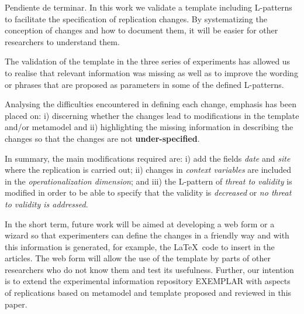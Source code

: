 
\textcolor[rgb]{1,0,0}{Pendiente de terminar.} In this work we validate a template including L-patterns to facilitate the specification of replication changes. By systematizing the conception of changes and how to document them, it will be easier for other researchers to understand them.


The validation of the template in the three series of experiments has allowed us to realise that relevant information was missing as well as to improve the wording or phrases that are proposed as parameters in some of the defined L-patterns. 

Analysing the difficulties encountered in defining each change, emphasis has been placed on: i) discerning whether the changes lead to modifications in the template and/or metamodel and ii) highlighting the missing information in describing the changes so that the changes are not \textbf{under-specified}.

In summary, the main modifications required are:
i) add the fields \emph{date} and \emph{site} where the replication is carried out; ii) changes in \emph{context variables} are included in the  \emph{operationalization dimension}; and iii) the L-pattern of \emph{threat to validity} is modified in order to be able to specify that the validity is \emph{decreased} or \emph{no threat to validity is addressed}.


In the short term, future work will be aimed at developing a web form or a wizard so that experimenters can define the changes in a friendly way and with this information is generated, for example, the \LaTeX\ code to insert in the articles. The web form will allow the use of the template by parts of other researchers who do not know them and test its usefulness.
Further, our intention is to extend the experimental information repository EXEMPLAR \cite{ParejoExemplar2014} with aspects of replications based on metamodel and template proposed and reviewed in this paper.